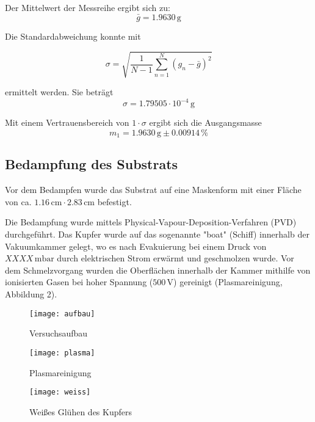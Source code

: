 \documentclass[a4paper, 12pt]{article}
\begin{document}
\noindent Der Mittelwert der Messreihe ergibt sich zu:
$$\bar{g} = 1.9630 \, \si{\gram}$$

\noindent Die Standardabweichung konnte mit

$$\sigma = \sqrt{ \frac{1}{N-1} \sum_{n=1}^{N}{( g_n - \bar{g} ) ^2} }$$

\noindent ermittelt werden. Sie beträgt\\
$$\sigma = 1.79505 \cdot 10^{-4} \, \si{\gram}$$

\noindent Mit einem Vertrauensbereich von $1 \cdot \sigma$ ergibt sich die Ausgangsmasse
$$m_1 = 1.9630 \, \si{\gram} \pm 0.00914 \, \si{\percent}$$

\subsection{Bedampfung des Substrats}
Vor dem Bedampfen wurde das Substrat auf eine Maskenform mit einer Fläche von ca. $1.16
\,\si{\centi\meter} \cdot 2.83\, \si{\centi\meter}$ befestigt.

Die Bedampfung wurde mittels Physical-Vapour-Deposition-Verfahren (PVD) durchgeführt. Das Kupfer wurde auf das sogenannte "boat" (Schiff) innerhalb der Vakuumkammer gelegt, wo es nach Evakuierung bei einem Druck von $XXXX \, \si{\milli\bar}$ durch elektrischen Strom erwärmt und geschmolzen wurde. Vor dem Schmelzvorgang wurden die Oberflächen innerhalb der Kammer mithilfe von ionisierten Gasen bei hoher Spannung ($500 \, \si{\volt}$) gereinigt (Plasmareinigung, Abbildung 2).\\

\begin{figure}[H]
	\begin{center}
		\texttt{[image: aufbau]}
	\end{center}
	\caption{Versuchsaufbau}
\end{figure}

\begin{figure}[H]
	\begin{center}
		\texttt{[image: plasma]}
	\end{center}
	\caption{Plasmareinigung}
\end{figure}

\begin{figure}[H]
\begin{center}
	\texttt{[image: weiss]}
\end{center}
\caption{Weißes Glühen des Kupfers}
\end{figure}
\end{document}
